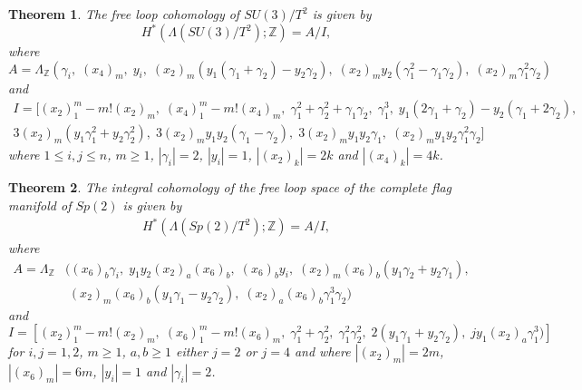 \documentclass{article}
\theoremstyle{plain}
\newtheorem{thm}{Theorem}[section]
\theoremstyle{definition}
\numberwithin{thm}{section}
\begin{document}
			{
			
			\begin{thm}
				The free loop cohomology of $SU(3)/T^2$ is given by
				\begin{equation*}
					H^*(\Lambda(SU(3)/T^2);\mathbb{Z})=A/I,
				\end{equation*}
				where
				\begin{equation*}
					A=\Lambda_{\mathbb{Z}}(\gamma_i,\; (x_4)_m,\; y_i,\; (x_2)_m(y_1(\gamma_1+\gamma_2)-y_2\gamma_2),\; (x_2)_my_2(\gamma_1^2-\gamma_1\gamma_2),\;
					(x_2)_m\gamma_1^2\gamma_2)
				\end{equation*}
				and
				\begin{align*}
					I=[(x_2)_1^m-m!(x_2)_m,\; (x_4)_1^m-m!(x_4)_m,\; \gamma_1^2+\gamma_2^2+\gamma_1\gamma_2,\;
					\gamma_1^3,\; y_1(2\gamma_1+\gamma_2)-y_2(\gamma_1+2\gamma_2),\; \\
					3(x_2)_m(y_1\gamma_1^2+y_2\gamma_2^2),\; 3(x_2)_my_1y_2(\gamma_1-\gamma_2),\; 3(x_2)_my_1y_2\gamma_1,\; (x_2)_my_1y_2\gamma_1^2\gamma_2]
				\end{align*}
				where $1\leq i,j \leq n$, $m\geq 1$,
				$|\gamma_i|=2$, $|y_i|=1$, $|(x_2)_k|=2k$ and $|(x_4)_k|=4k$.
			\end{thm}
			\addtocounter{thm}{-1}
			}
			
			{
			
			\begin{thm}
				The integral cohomology of the free loop space of the complete flag manifold of $Sp(2)$ is given by
				\begin{align*}
					H^*(\Lambda(Sp(2)/T^2);\mathbb{Z})= A/I,
				\end{align*}
				where
				\begin{align*}
					A=\Lambda_{\mathbb{Z}}&((x_6)_b\gamma_i,\;y_1y_2(x_2)_a(x_6)_b,\;(x_6)_by_i,\;(x_2)_m(x_6)_b(y_1\gamma_2+y_2\gamma_1), \\
						&\;(x_2)_m(x_6)_b(y_1\gamma_1-y_2\gamma_2),\;(x_2)_a(x_6)_b\gamma_1^3\gamma_2)
				\end{align*}
				and
				\begin{equation*}
					I=[(x_2)_1^m-m!(x_2)_m,\;(x_6)_1^m-m!(x_6)_m,\;\gamma_1^2+\gamma_2^2,\;\gamma_1^2\gamma_2^2,\;2(y_1\gamma_1+y_2\gamma_2),\;jy_1(x_2)_a\gamma_1^3)]
				\end{equation*}
				for $i,j=1,2$, $m\geq 1$, $a,b\geq 1$ either $j=2$ or $j=4$ and where $|(x_2)_m|=2m$, $|(x_6)_m|=6m$, $|y_i|=1$ and $|\gamma_i|=2$.
			\end{thm}
			\addtocounter{thm}{-1}
			}
			
\end{document}

